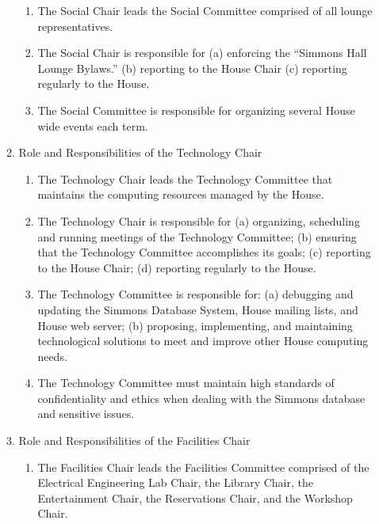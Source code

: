 \documentclass[letterpaper]{article}
\begin{document}
\begin{enumerate}
\begin{enumerate}
\begin{enumerate}

\item The Social Chair leads the Social Committee comprised of all lounge representatives.
 
\item The Social Chair is responsible for (a) enforcing the ``Simmons Hall Lounge Bylaws.'' (b) reporting to the House Chair (c) reporting regularly to the House.

\item The Social Committee is responsible for organizing several House wide events each term.

\end{enumerate}

\item Role and Responsibilities of the Technology Chair 

\begin{enumerate}

\item The Technology Chair leads the Technology Committee that maintains the computing resources managed by the House. 

\item The Technology Chair is responsible for (a) organizing, scheduling and running meetings of the Technology Committee; (b) ensuring that the Technology Committee accomplishes its goals; (c) reporting to the House Chair; (d) reporting regularly to the House.

\item The Technology Committee is responsible for: (a) debugging and updating the Simmons Database System, House mailing lists, and House web server; (b) proposing, implementing, and maintaining technological solutions to meet and improve other House computing needs.

\item The Technology Committee must maintain high standards of confidentiality and ethics when dealing with the Simmons database and sensitive issues.

\end{enumerate}

\item Role and Responsibilities of the Facilities Chair 

\begin{enumerate}

\item The Facilities Chair leads the Facilities Committee comprised of the Electrical Engineering Lab Chair, the Library Chair, the Entertainment Chair, the Reservations Chair, and the Workshop Chair. 


\end{enumerate}
\end{enumerate}
\end{enumerate}
\end{document}
